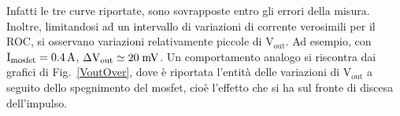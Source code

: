 Infatti le tre curve riportate, sono sovrapposte entro gli errori della misura.
Inoltre, limitandosi ad un intervallo di variazioni di corrente verosimili per il ROC, si osservano variazioni relativamente piccole di $\mathrm{V_{out}}$.
Ad esempio, con $\mathrm{I_{mosfet}= 0.4 \rm \, A}$, $\mathrm{\Delta V_{out} \simeq 20\rm \; mV}$.
Un comportamento analogo si riscontra dai grafici di Fig.~\ref{VoutOver}, dove è riportata l'entità delle variazioni di $\mathrm{V_{out}}$ a seguito dello spegnimento del mosfet, cioè l'effetto che si ha sul fronte di discesa dell'impulso. 

